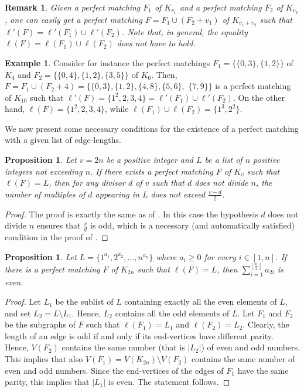 \documentclass{amsart}
\newtheorem{prop}[defi]{Proposition}
\newtheorem{rem}[defi]{Remark}
\theoremstyle{definition}
\newtheorem{ex}[defi]{Example}
\numberwithin{equation}{section}
\begin{document}
\begin{rem}\label{rem:F1+F2}
Given a perfect matching $F_1$ of $K_{v_1}$ and a perfect matching $F_2$ of $K_{v_2}$, one can easily
get a perfect matching $F=F_1\cup (F_2+v_1)$ of $K_{v_1+v_2}$ such that $\ell'(F)=\ell'(F_1)\cup \ell'(F_2)$.
Note that, in general, the equality $\ell(F) =\ell(F_1)\cup \ell(F_2)$ does not have to hold.
\end{rem}

\begin{ex}
Consider for instance the perfect matchings $F_1=\{\{0,3\},\{1,2\}\}$ of $K_4$ and
$F_2=\{\{0,4\},\{1,2\},\{3,5\}\}$ of $K_6$. Then, $F=F_1\cup (F_2+4)=\{\{0,3\},\{1,2\},\{4,8\},\{5,6\},$ $\{7,9\}\}$
is a perfect matching of $K_{10}$ such that $\ell'(F)=\{1^2,2,3,4\}=\ell'(F_1)\cup\ell'(F_2)$.
On the other hand, $\ell(F)=\{1^2,2,3,4\}$,  while $\ell(F_1)\cup\ell(F_2)=\{1^3,2^2\}$.
\end{ex}


We now present some necessary conditions for the existence of a perfect matching with a given list of edge-lengths.


\begin{prop}\label{prop:MPP}
Let $v=2n$ be a positive integer and  $L$ be a list of $n$ positive integers not
exceeding $n$.
If there exists a perfect matching $F$ of $K_v$ such that $\ell(F)=L$, then
for any divisor $d$ of $v$ such that $d$ does not divide $n$, the number of multiples of $d$
appearing in $L$ does not exceed $\frac{v-d}{2}$.
\end{prop}
\begin{proof}
The proof is exactly the same as of \cite[Proposition 1]{PP}.
In this case the hypothesis $d$ does not divide $n$ ensures that $\frac{v}{d}$ is odd, which is
a necessary (and automatically satisfied) condition in  the proof of \cite[Proposition 1]{PP}.
\end{proof}

\begin{prop}\label{prop:EvenNumber}
Let $L=\{1^{a_1},2^{a_2},\ldots,n^{a_n}\}$ where $a_i\geq 0$ for every $i\in[1,n]$.
If there is a perfect matching $F$ of $K_{2n}$ such that $\ell(F)=L$, then
$\sum\limits_{i=1}^{\left\lfloor\frac{n}{2}\right\rfloor} a_{2i}$ is even.
\end{prop}

\begin{proof}
Let $L_1$ be the sublist of $L$ containing exactly all the even elements of $L$, and set $L_2=L\setminus L_1$.
Hence, $L_2$ contains all the odd elements of $L$. Let $F_1$ and $F_2$ be the subgraphs of $F$  such that $\ell(F_1)=L_1$
and $\ell(F_2)=L_2$. Clearly, the length of an edge is odd if and only if its end-vertices have different parity.
Hence, $V(F_2)$ contains the same number (that is $|L_2|$) of even and odd numbers.
This implies that also $V(F_1)=V(K_{2n})\setminus V(F_2)$ contains the same number of even and odd numbers.
Since the end-vertices of the edges of $F_1$ have the same parity, this implies that $|L_1|$ is even.
The statement follows.
\end{proof}
\end{document}
